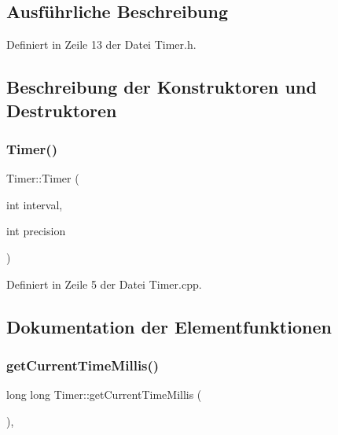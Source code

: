 \subsection{Ausführliche Beschreibung}


Definiert in Zeile 13 der Datei Timer.\+h.



\subsection{Beschreibung der Konstruktoren und Destruktoren}
\mbox{\label{class_timer_a5712c673f940c048eaa49440e9a57fab}} 
\subsubsection{\texorpdfstring{Timer()}{Timer()}}
{\footnotesize\ttfamily Timer\+::\+Timer (\begin{DoxyParamCaption}\item[{int}]{interval,  }\item[{int}]{precision }\end{DoxyParamCaption})}



Definiert in Zeile 5 der Datei Timer.\+cpp.



\subsection{Dokumentation der Elementfunktionen}
\mbox{\label{class_timer_a39a332f8ce3a45ed8d78c772755342c8}} 
\subsubsection{\texorpdfstring{get\+Current\+Time\+Millis()}{getCurrentTimeMillis()}}
{\footnotesize\ttfamily long long Timer\+::get\+Current\+Time\+Millis (\begin{DoxyParamCaption}{ }\end{DoxyParamCaption})\hspace{0.3cm}{\ttfamily [inline]}, {\ttfamily [private]}}



